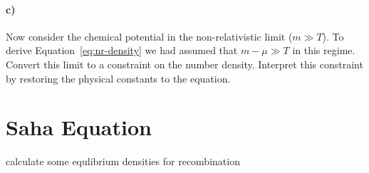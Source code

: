 \documentclass[12pt]{article}
\begin{document}
\paragraph{c)} Now consider the chemical potential in the non-relativistic limit
($m \gg T$). To derive Equation~\ref{eq:nr-density} we had assumed that $m - \mu
\gg T$ in this regime. Convert this limit to a constraint on the number density.
Interpret this constraint by restoring the physical constants to the equation.


\section{Saha Equation}
calculate some equlibrium densities for recombination


\section{}
\end{document}
